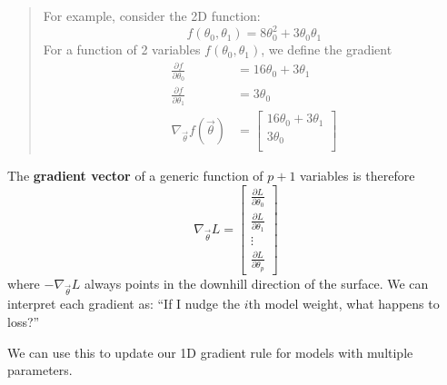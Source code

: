 \documentclass[
  letterpaper,
  DIV=11,
  numbers=noendperiod]{scrreprt}
\begin{document}
\begin{quote}
For example, consider the 2D function:
\[f(\theta_0, \theta_1) = 8 \theta_0^2 + 3\theta_0\theta_1\] For a
function of 2 variables \(f(\theta_0, \theta_1)\), we define the
gradient \[
\begin{align}
\frac{\partial f}{\partial \theta_{0}} &= 16\theta_0 + 3\theta_1 \\
\frac{\partial f}{\partial \theta_{1}} &= 3\theta_0 \\
\nabla_{\vec{\theta}} f(\vec{\theta}) &=  \begin{bmatrix} 16\theta_0 + 3\theta_1 \\ 3\theta_0 \\ \end{bmatrix}
\end{align}
\]
\end{quote}

The \textbf{gradient vector} of a generic function of \(p+1\) variables
is therefore
\[\nabla_{\vec{\theta}} L =  \begin{bmatrix} \frac{\partial L}{\partial \theta_0} \\ \frac{\partial L}{\partial \theta_1} \\ \vdots \\ \frac{\partial L}{\partial \theta_p} \end{bmatrix}\]
where \(- \nabla_\vec{\theta} L\) always points in the downhill
direction of the surface. We can interpret each gradient as: ``If I
nudge the \(i\)th model weight, what happens to loss?''

We can use this to update our 1D gradient rule for models with multiple
parameters.
\end{document}
